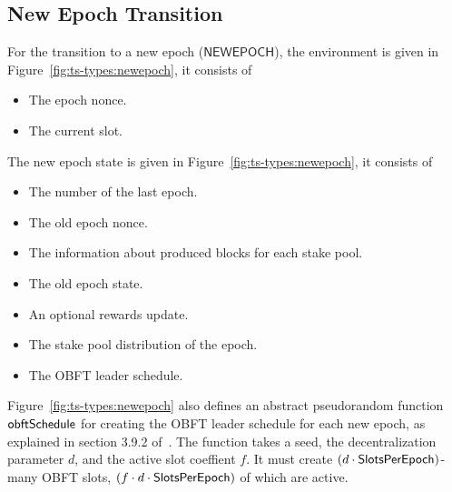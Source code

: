 \clearpage

\subsection{New Epoch Transition}
\label{sec:new-epoch-trans}

For the transition to a new epoch ($\mathsf{NEWEPOCH}$), the environment is
given in Figure~\ref{fig:ts-types:newepoch}, it consists of

\begin{itemize}
\item The epoch nonce.
\item The current slot.
\end{itemize}
The new epoch state is given in Figure~\ref{fig:ts-types:newepoch}, it consists
of

\begin{itemize}
\item The number of the last epoch.
\item The old epoch nonce.
\item The information about produced blocks for each stake pool.
\item The old epoch state.
\item An optional rewards update.
\item The stake pool distribution of the epoch.
\item The OBFT leader schedule.
\end{itemize}

Figure~\ref{fig:ts-types:newepoch} also defines an abstract pseudorandom function
$\mathsf{obftSchedule}$ for creating the OBFT leader schedule for each new epoch,
as explained in section 3.9.2 of~\cite{delegation_design}.
The function takes a seed, the decentralization parameter $d$, and the active slot coeffient $f$.
It must create $(d\cdot\mathsf{SlotsPerEpoch})$-many OBFT slots, $(f\cdot d\cdot \mathsf{SlotsPerEpoch})$
of which are active.

